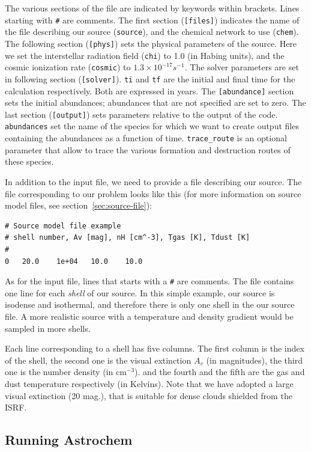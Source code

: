 \documentclass[a4paper,12pt]{article}
\begin{document}
The various sections of the file are indicated by keywords within
brackets. Lines starting with \verb=#= are comments. The first section
(\verb=[files]=) indicates the name of the file describing our source
(\verb=source=), and the chemical network to use (\verb=chem=). The
following section (\verb=[phys]=) sets the physical parameters of the
source. Here we set the interstellar radiation field (\verb=chi=) to
1.0 (in Habing units), and the cosmic ionization rate (\verb=cosmic=)
to $1.3 \times 10^{-17} s^{-1}$. The solver parameters are set in
following section (\verb=[solver]=). \verb=ti= and \verb=tf= are the
initial and final time for the calculation respectively. Both are
expressed in years. The \verb=[abundance]= section sets the initial
abundances; abundances that are not specified are set to zero. The
last section (\verb=[output]=) sets parameters relative to the output
of the code. \verb=abundances= set the name of the species for which
we want to create output files containing the abundances as a function
of time. \verb=trace_route= is an optional parameter that allow to
trace the various formation and destruction routes of these species.

In addition to the input file, we need to provide a file describing
our source. The file corresponding to our problem looks like this (for
more information on source model files, see
section~\ref{sec:source-file}):

\begin{verbatim}
# Source model file example
# shell number, Av [mag], nH [cm^-3], Tgas [K], Tdust [K]
#
0	20.0	1e+04	10.0	10.0
\end{verbatim}

As for the input file, lines that starts with a \verb=#= are
comments. The file contains one line for each \emph{shell} of our
source. In this simple example, our source is isodense and isothermal,
and therefore there is only one shell in the our source file. A more
realistic source with a temperature and density gradient would be
sampled in more shells.

Each line corresponding to a shell has five columns. The first column
is the index of the shell, the second one is the visual extinction
$A_{v}$ (in magnitudes), the third one is the number density (in
cm$^{-3}$). and the fourth and the fifth are the gas and dust
temperature respectively (in Kelvins).  Note that we have adopted a
large visual extinction (20 mag.), that is suitable for dense clouds
shielded from the ISRF.

\subsection{Running Astrochem}
\label{sec:running-astrochem}
\end{document}
